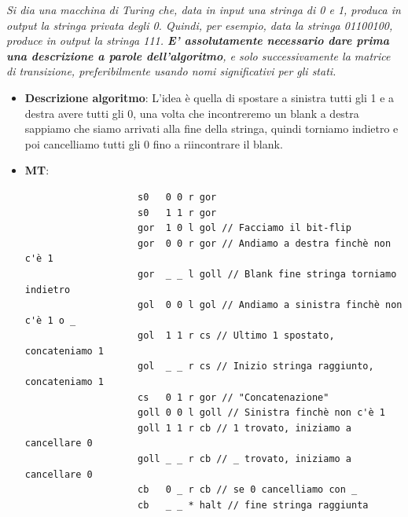 \documentclass[12pt, a4paper]{report}
\begin{document}
            \begin{exercise}
                \textit{Si dia una macchina di Turing che, data in input una stringa di 0 e 1, produca in output la stringa privata degli 0. Quindi, per esempio, data la stringa 01100100, produce in output la stringa 111. \textbf{E' assolutamente necessario dare prima una descrizione a parole dell'algoritmo}, e solo successivamente la matrice di transizione, preferibilmente usando nomi significativi per gli stati.}\\
                \begin{itemize}
                    \item \textbf{Descrizione algoritmo}: L'idea è quella di spostare a sinistra tutti gli 1 e a destra avere tutti gli 0, una volta che incontreremo un blank a destra sappiamo che siamo arrivati alla fine della stringa, quindi torniamo indietro e poi cancelliamo tutti gli 0 fino a riincontrare il blank.
                    \item \textbf{MT}: \begin{verbatim}
                    s0   0 0 r gor
                    s0   1 1 r gor
                    gor  1 0 l gol // Facciamo il bit-flip
                    gor  0 0 r gor // Andiamo a destra finchè non c'è 1
                    gor  _ _ l goll // Blank fine stringa torniamo indietro
                    gol  0 0 l gol // Andiamo a sinistra finchè non c'è 1 o _
                    gol  1 1 r cs // Ultimo 1 spostato, concateniamo 1
                    gol  _ _ r cs // Inizio stringa raggiunto, concateniamo 1
                    cs   0 1 r gor // "Concatenazione"
                    goll 0 0 l goll // Sinistra finchè non c'è 1
                    goll 1 1 r cb // 1 trovato, iniziamo a cancellare 0
                    goll _ _ r cb // _ trovato, iniziamo a cancellare 0
                    cb   0 _ r cb // se 0 cancelliamo con _
                    cb   _ _ * halt // fine stringa raggiunta
                    \end{verbatim}
                \end{itemize}
            \end{exercise}        
\end{document}
